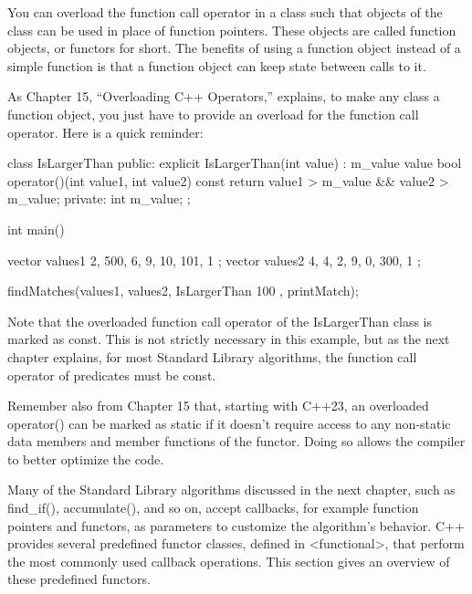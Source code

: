 
You can overload the function call operator in a class such that objects of the class can be used in place of function pointers. These objects are called function objects, or functors for short. The benefits of using a function object instead of a simple function is that a function object can keep state between calls to it.


As Chapter 15, “Overloading C++ Operators,” explains, to make any class a function object, you just have to provide an overload for the function call operator. Here is a quick reminder:

\begin{cpp}
class IsLargerThan
{
    public:
        explicit IsLargerThan(int value) : m_value { value } {}
        bool operator()(int value1, int value2) const {
            return value1 > m_value && value2 > m_value;
        }
    private:
        int m_value;
};

int main()
{
    vector values1 { 2, 500, 6, 9, 10, 101, 1 };
    vector values2 { 4, 4, 2, 9, 0, 300, 1 };

    findMatches(values1, values2, IsLargerThan { 100 }, printMatch);
}
\end{cpp}

Note that the overloaded function call operator of the IsLargerThan class is marked as const. This is not strictly necessary in this example, but as the next chapter explains, for most Standard Library algorithms, the function call operator of predicates must be const.


Remember also from Chapter 15 that, starting with C++23, an overloaded operator() can be marked as static if it doesn’t require access to any non-static data members and member functions of the functor. Doing so allows the compiler to better optimize the code.


Many of the Standard Library algorithms discussed in the next chapter, such as find\_if(), accumulate(), and so on, accept callbacks, for example function pointers and functors, as parameters to customize the algorithm’s behavior. C++ provides several predefined functor classes, defined in <functional>, that perform the most commonly used callback operations. This section gives an overview of these predefined functors.

